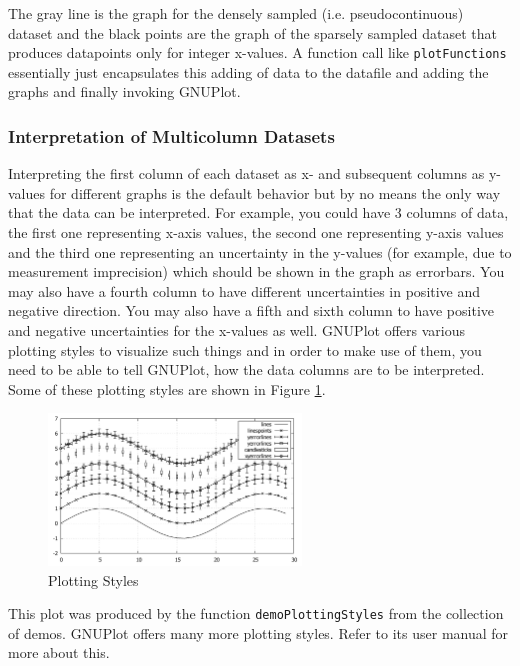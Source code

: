 \documentclass[11pt]{article}
\begin{document}
The gray line is the graph for the densely sampled (i.e. pseudocontinuous) dataset and the black points are the graph of the sparsely sampled dataset that produces datapoints only for integer x-values. A function call like \texttt{plotFunctions} essentially just encapsulates this adding of data to the datafile and adding the graphs and finally invoking GNUPlot. 

\subsubsection{Interpretation of Multicolumn Datasets}
Interpreting the first column of each dataset as x- and subsequent columns as y-values for different graphs is the default behavior but by no means the only way that the data can be interpreted. For example, you could have 3 columns of data, the first one representing x-axis values, the second one representing y-axis values and the third one representing an uncertainty in the y-values (for example, due to measurement imprecision) which should be shown in the graph as errorbars. You may also have a fourth column to have different uncertainties in positive and negative direction. You may also have a fifth and sixth column to have positive and negative uncertainties for the x-values as well. GNUPlot offers various plotting styles to visualize such things and in order to make use of them, you need to be able to tell GNUPlot, how the data columns are to be interpreted. Some of these plotting styles are shown in Figure \ref{fig:PlottingStyles}.
\begin{figure}[h!]
	\centering
  	\includegraphics[width=0.60\textwidth]{Plots/PlottingStyles.pdf}
	\caption{Plotting Styles}
	\label{fig:PlottingStyles}
\end{figure}
This plot was produced by the function \texttt{demoPlottingStyles} from the collection of demos. GNUPlot offers many more plotting styles. Refer to its user manual for more about this.

\end{document}
